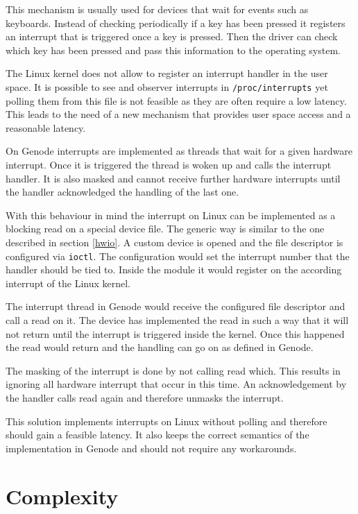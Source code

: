 \documentclass[
a4paper,
12pt,
notitlepage,
parskip=half,
DIV=11,
]{scrbook}
\begin{document}
		This mechanism is usually used for devices that wait for events such as keyboards.
		Instead of checking periodically if a key has been pressed it registers an interrupt that is triggered once a key is pressed.
		Then the driver can check which key has been pressed and pass this information to the operating system.
		
		The Linux kernel does not allow to register an interrupt handler in the user space.
		It is possible to see and observer interrupts in \texttt{/proc/interrupts} yet polling them from this file is not feasible as they are often require a low latency.
		This leads to the need of a new mechanism that provides user space access and a reasonable latency.
		
		On Genode interrupts are implemented as threads that wait for a given hardware interrupt.
		Once it is triggered the thread is woken up and calls the interrupt handler.
		It is also masked and cannot receive further hardware interrupts until the handler acknowledged the handling of the last one. \citep{genode}
		
		With this behaviour in mind the interrupt on Linux can be implemented as a blocking read on a special device file.
		The generic way is similar to the one described in section \ref{hwio}.
		A custom device is opened and the file descriptor is configured via \texttt{ioctl}.
		The configuration would set the interrupt number that the handler should be tied to.
		Inside the module it would register on the according interrupt of the Linux kernel.
		
		The interrupt thread in Genode would receive the configured file descriptor and call a read on it.
		The device has implemented the read in such a way that it will not return until the interrupt is triggered inside the kernel.
		Once this happened the read would return and the handling can go on as defined in Genode.
		
		The masking of the interrupt is done by not calling read which.
		This results in ignoring all hardware interrupt that occur in this time.
		An acknowledgement by the handler calls read again and therefore unmasks the interrupt.
		
		This solution implements interrupts on Linux without polling and therefore should gain a feasible latency.
		It also keeps the correct semantics of the implementation in Genode and should not require any workarounds.
		
		\section{Complexity}
		
\end{document}
